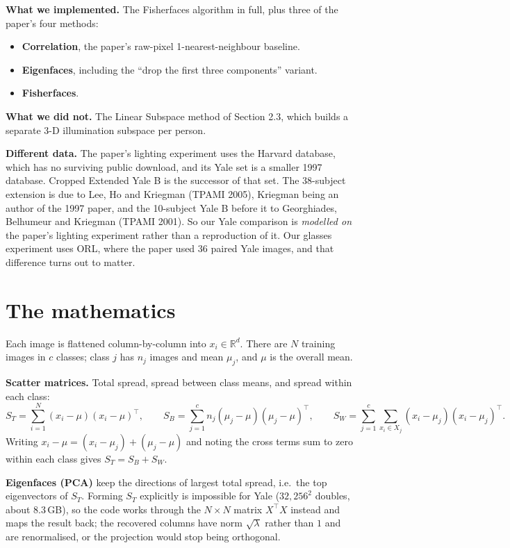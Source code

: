 \documentclass[11pt]{article}
\newcommand{\T}{^{\top}}
\begin{document}
\textbf{What we implemented.} The Fisherfaces algorithm in full, plus three of the paper's four methods:
\begin{itemize}
\item \textbf{Correlation}, the paper's raw-pixel 1-nearest-neighbour baseline.
\item \textbf{Eigenfaces}, including the ``drop the first three components'' variant.
\item \textbf{Fisherfaces}.
\end{itemize}

\textbf{What we did not.} The Linear Subspace method of Section 2.3, which builds a separate 3-D illumination subspace per person.

\textbf{Different data.} The paper's lighting experiment uses the Harvard database, which has no surviving public download, and its Yale set is a smaller 1997 database. Cropped Extended Yale B is the successor of that set. The 38-subject extension is due to Lee, Ho and Kriegman (TPAMI 2005), Kriegman being an author of the 1997 paper, and the 10-subject Yale B before it to Georghiades, Belhumeur and Kriegman (TPAMI 2001). So our Yale comparison is \emph{modelled on} the paper's lighting experiment rather than a reproduction of it. Our glasses experiment uses ORL, where the paper used 36 paired Yale images, and that difference turns out to matter.

\section{The mathematics}
Each image is flattened column-by-column into $x_i\in\mathbb R^d$. There are $N$ training images in $c$ classes; class $j$ has $n_j$ images and mean $\mu_j$, and $\mu$ is the overall mean.

\textbf{Scatter matrices.} Total spread, spread between class means, and spread within each class:
\[
S_T=\sum_{i=1}^{N}(x_i-\mu)(x_i-\mu)\T,\qquad
S_B=\sum_{j=1}^{c}n_j(\mu_j-\mu)(\mu_j-\mu)\T,\qquad
S_W=\sum_{j=1}^{c}\sum_{x_i\in X_j}(x_i-\mu_j)(x_i-\mu_j)\T .
\]
Writing $x_i-\mu=(x_i-\mu_j)+(\mu_j-\mu)$ and noting the cross terms sum to zero within each class gives $S_T=S_B+S_W$.

\textbf{Eigenfaces (PCA)} keep the directions of largest total spread, i.e.\ the top eigenvectors of $S_T$. Forming $S_T$ explicitly is impossible for Yale ($32{,}256^2$ doubles, about $8.3$\,GB), so the code works through the $N\times N$ matrix $X\T X$ instead and maps the result back; the recovered columns have norm $\sqrt\lambda$ rather than $1$ and are renormalised, or the projection would stop being orthogonal.
\end{document}
